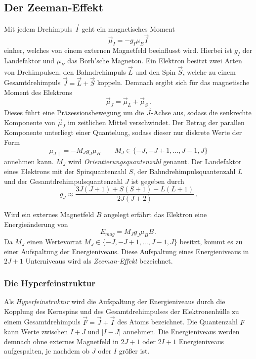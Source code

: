 \subsection{Der Zeeman-Effekt}
Mit jedem Drehimpuls $\vec{I}$ geht ein magnetisches Moment
\begin{equation}
\vec{\mu}_I = -g_I \mu_B \vec{I}
\end{equation}
einher, welches von einem externen Magnetfeld beeinflusst wird.
Hierbei ist $g_I$ der Landefaktor und $\mu_B$ das Borh'sche Magneton.
Ein Elektron besitzt zwei Arten von Drehimpulsen, den Bahndrehimpuls $\vec{L}$ und den Spin $\vec{S}$, welche zu einem Gesamtdrehimpuls $\vec{J} = \vec{L} + \vec{S}$ koppeln.
Demnach ergibt sich für das magnetische Moment des Elektrons
\begin{equation}
\vec{\mu}_J = \vec{\mu}_L + \vec{\mu}_S \, .
\end{equation}
Dieses führt eine Präzessionsbewegung um die $\vec{J}$-Achse aus, sodass die senkrechte Komponente von $\vec{\mu}_J$ im zeitlichen Mittel verschwindet.
Der Betrag der parallen Komponente unterliegt einer Quantelung, sodass dieser nur diskrete Werte der Form
\begin{equation}
\mu_{J\parallel} = - M_J g_J \mu_B \qquad M_J \in \{-J, -J+1, ..., J-1, J\}
\end{equation}
annehmen kann. 
$M_J$ wird \textit{Orientierungsquantenzahl} genannt.
Der Landefaktor eines Elektrons mit der Spinquantenzahl $S$, der Bahndrehimpulsquantenzahl $L$ und der Gesamtdrehimpulsquantenzahl $J$ ist gegeben durch
\begin{equation}
g_J \approx \frac{3 J(J+1)+S(S+1)- L(L+1)}{2J(J+2)}\, .
\end{equation}

Wird ein externes Magnetfeld $B$ angelegt erfährt das Elektron eine Energieänderung von
\begin{equation}\label{eq:deltaE}
E_{mag} = M_J g_J \mu_B B \, .
\end{equation}
Da $M_J$ einen Wertevorrat $M_J \in \{-J, -J+1, ..., J-1, J\}$ besitzt, kommt es zu einer Aufspaltung der Energieniveaus.
Diese Aufspaltung eines Energieniveaus in $2J+1$ Unterniveaus wird als \textit{Zeeman-Effekt} bezeichnet.

\subsubsection*{Die Hyperfeinstruktur}
Als \textit{Hyperfeinstruktur} wird die Aufspaltung der Energieniveaus durch die Kopplung des Kernspins und des Gesamtdrehimpulses der Elektronenhülle zu einem Gesamtdrehimpuls $\vec{F} = \vec{J} + \vec{I}$ des Atoms bezeichnet.
Die Quantenzahl $F$ kann Werte zwischen $I+J$ und $|I-J|$ annehmen.
Die Energieniveaus werden demnach ohne externes Magnetfeld in $2J+1$ oder $2I+1$ Energieniveaus aufgespalten, je nachdem ob $J$ oder $I$ größer ist.


